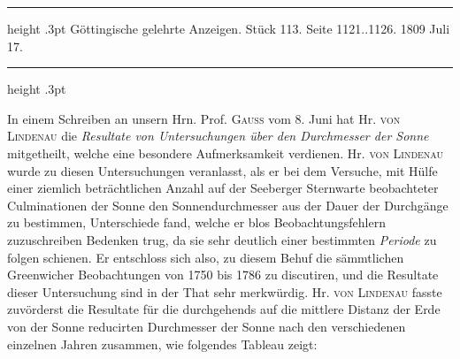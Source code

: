 \par{}\bigskip
\hypertarget{native-524-lower}{}\label{native-524-lower}
\begin{center}
\parbox{.9\linewidth}{%
\centering\small
\hrule height .3pt\relax\vspace{2.5pt}
Göttingische gelehrte Anzeigen. Stück 113. Seite 1121..1126. 1809 Juli 17.\par
\vspace{2.5pt}\hrule height .3pt\relax
}
\end{center}
\par\nobreak\medskip

In einem Schreiben an unsern Hrn. Prof. \textsc{Gauss} vom 8. Juni hat Hr. \textsc{von Lindenau} die \emph{Resultate von Untersuchungen über den Durchmesser der Sonne} mitgetheilt, welche eine besondere Aufmerksamkeit verdienen. Hr. \textsc{von Lindenau} wurde zu diesen Untersuchungen veranlasst, als er bei dem Versuche, mit Hülfe einer ziemlich beträchtlichen Anzahl auf der Seeberger Sternwarte beobachteter Culminationen der Sonne den Sonnendurchmesser aus der Dauer der Durchgänge zu bestimmen, Unterschiede fand, welche er blos Beobachtungsfehlern zuzuschreiben Bedenken trug, da sie sehr deutlich einer bestimmten \emph{Periode} zu folgen schienen. Er entschloss sich also, zu diesem Behuf die sämmtlichen Greenwicher Beobachtungen von 1750 bis 1786 zu discutiren, und die Resultate dieser Untersuchung sind in der That sehr merkwürdig. Hr. \textsc{von Lindenau} fasste zuvörderst die Resultate für die durchgehends auf die mittlere Distanz der Erde von der Sonne reducirten Durchmesser der Sonne nach den verschiedenen einzelnen Jahren zusammen, wie folgendes Tableau zeigt:

